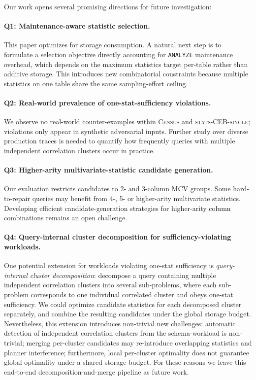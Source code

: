 \documentclass[sigconf, nonacm]{acmart}
\begin{document}
Our work opens several promising directions for future investigation:

\paragraph{Q1: Maintenance-aware statistic selection.}
This paper optimizes for storage consumption. A natural next step is to formulate a selection objective directly accounting for \texttt{ANALYZE} maintenance overhead, which depends on the maximum statistics target per-table rather than additive storage. This introduces new combinatorial constraints because multiple statistics on one table share the same sampling-effort ceiling.

\paragraph{Q2: Real-world prevalence of one-stat-sufficiency violations.}
We observe no real-world counter-examples within \textsc{Census} and \textsc{stats-CEB-single}; violations only appear in synthetic adversarial inputs. Further study over diverse production traces is needed to quantify how frequently queries with multiple independent correlation clusters occur in practice.

\paragraph{Q3: Higher-arity multivariate-statistic candidate generation.}
Our evaluation restricts candidates to 2- and 3-column MCV groups. Some hard-to-repair queries may benefit from 4-, 5- or higher-arity multivariate statistics. Developing efficient candidate-generation strategies for higher-arity column combinations remains an open challenge.

\paragraph{Q4: Query-internal cluster decomposition for sufficiency-violating workloads.}
One potential extension for workloads violating one-stat sufficiency is
\emph{query-internal cluster decomposition}: decompose a query containing
multiple independent correlation clusters into several sub-problems, where each
sub-problem corresponds to one individual correlated cluster and obeys one-stat
sufficiency. We could optimize candidate statistics for each decomposed cluster
separately, and combine the resulting candidates under the global storage
budget. Nevertheless, this extension introduces non-trivial new challenges:
automatic detection of independent correlation clusters from the
schema-workload is non-trivial; merging per-cluster candidates may
re-introduce overlapping statistics and planner interference; furthermore,
local per-cluster optimality does not guarantee global optimality under a
shared storage budget. For these reasons we leave this end-to-end
decomposition-and-merge pipeline as future work.
\end{document}

